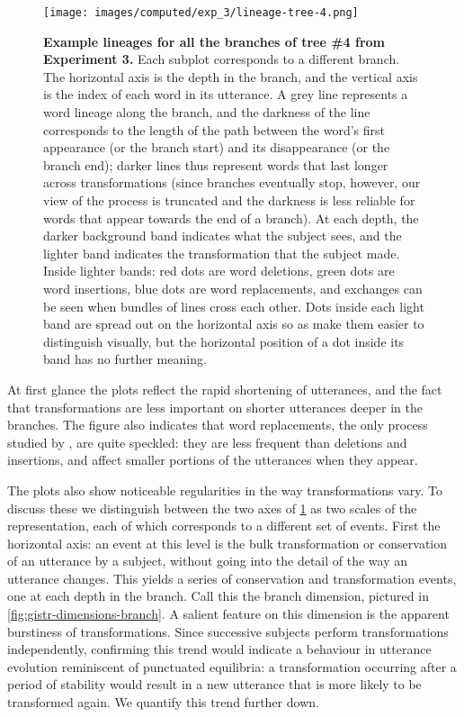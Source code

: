 \begin{figure}[!h]
  \centering
  \texttt{[image: images/computed/exp\_3/lineage-tree-4.png]}
  \caption[Example lineages for all the branches of tree \#4 from Experiment 3]{
  \textbf{Example lineages for all the branches of tree \#4 from Experiment 3.}
  Each subplot corresponds to a different branch.
  The horizontal axis is the depth in the branch, and the vertical axis is the index of each word in its utterance.
  A grey line represents a word lineage along the branch, and the darkness of the line corresponds to the length of the path between the word's first appearance (or the branch start) and its disappearance (or the branch end);
  darker lines thus represent words that last longer across transformations (since branches eventually stop, however, our view of the process is truncated and the darkness is less reliable for words that appear towards the end of a branch).
  At each depth, the darker background band indicates what the subject sees, and the lighter band indicates the transformation that the subject made.
  Inside lighter bands:
  red dots are word deletions, green dots are word insertions, blue dots are word replacements, and exchanges can be seen when bundles of lines cross each other.
  Dots inside each light band are spread out on the horizontal axis so as make them easier to distinguish visually, but the horizontal position of a dot inside its band has no further meaning.
  }
  \label{fig:gistr-lineage-tree}
\end{figure}

At first glance the plots reflect the rapid shortening of utterances,
and the fact that transformations are less important on shorter
utterances deeper in the branches. The figure also indicates that word
replacements, the only process studied by \textcite{lerique-2018-semantic-drift},
are quite speckled: they are less frequent than deletions and
insertions, and affect smaller portions of the utterances when they
appear. 

The plots also show noticeable regularities in the way transformations
vary. To discuss these we distinguish between the two axes of
\cref{fig:gistr-lineage-tree} as two scales of the representation, each
of which corresponds to a different set of events. First the horizontal
axis: an event at this level is the bulk transformation or conservation
of an utterance by a subject, without going into the detail of the way
an utterance changes. This yields a series of conservation and
transformation events, one at each depth in the branch. Call this the
branch dimension, pictured in \cref{fig:gistr-dimensions-branch}. A
salient feature on this dimension is the apparent burstiness of
transformations. Since successive subjects perform transformations
independently, confirming this trend would indicate a behaviour in
utterance evolution reminiscent of punctuated equilibria: a
transformation occurring after a period of stability would result in a
new utterance that is more likely to be transformed again. We quantify
this trend further down.

